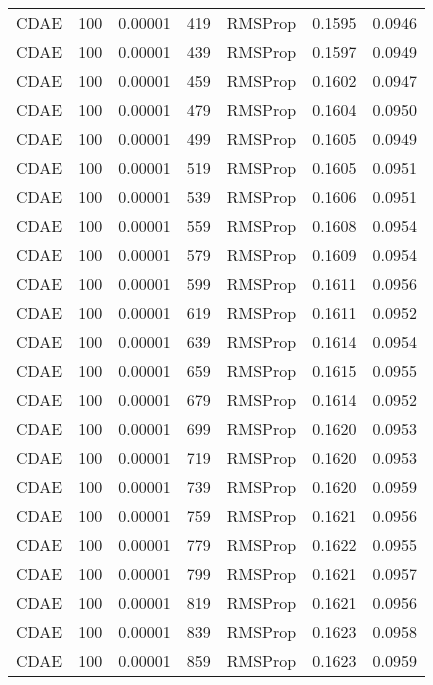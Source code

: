 \begin{tabular}{llrllrr}
    CDAE &  100 &  0.00001 &   419 &   RMSProp &  0.1595 &       0.0946 \\
    CDAE &  100 &  0.00001 &   439 &   RMSProp &  0.1597 &       0.0949 \\
    CDAE &  100 &  0.00001 &   459 &   RMSProp &  0.1602 &       0.0947 \\
    CDAE &  100 &  0.00001 &   479 &   RMSProp &  0.1604 &       0.0950 \\
    CDAE &  100 &  0.00001 &   499 &   RMSProp &  0.1605 &       0.0949 \\
    CDAE &  100 &  0.00001 &   519 &   RMSProp &  0.1605 &       0.0951 \\
    CDAE &  100 &  0.00001 &   539 &   RMSProp &  0.1606 &       0.0951 \\
    CDAE &  100 &  0.00001 &   559 &   RMSProp &  0.1608 &       0.0954 \\
    CDAE &  100 &  0.00001 &   579 &   RMSProp &  0.1609 &       0.0954 \\
    CDAE &  100 &  0.00001 &   599 &   RMSProp &  0.1611 &       0.0956 \\
    CDAE &  100 &  0.00001 &   619 &   RMSProp &  0.1611 &       0.0952 \\
    CDAE &  100 &  0.00001 &   639 &   RMSProp &  0.1614 &       0.0954 \\
    CDAE &  100 &  0.00001 &   659 &   RMSProp &  0.1615 &       0.0955 \\
    CDAE &  100 &  0.00001 &   679 &   RMSProp &  0.1614 &       0.0952 \\
    CDAE &  100 &  0.00001 &   699 &   RMSProp &  0.1620 &       0.0953 \\
    CDAE &  100 &  0.00001 &   719 &   RMSProp &  0.1620 &       0.0953 \\
    CDAE &  100 &  0.00001 &   739 &   RMSProp &  0.1620 &       0.0959 \\
    CDAE &  100 &  0.00001 &   759 &   RMSProp &  0.1621 &       0.0956 \\
    CDAE &  100 &  0.00001 &   779 &   RMSProp &  0.1622 &       0.0955 \\
    CDAE &  100 &  0.00001 &   799 &   RMSProp &  0.1621 &       0.0957 \\
    CDAE &  100 &  0.00001 &   819 &   RMSProp &  0.1621 &       0.0956 \\
    CDAE &  100 &  0.00001 &   839 &   RMSProp &  0.1623 &       0.0958 \\
    CDAE &  100 &  0.00001 &   859 &   RMSProp &  0.1623 &       0.0959 \\

\end{tabular}
